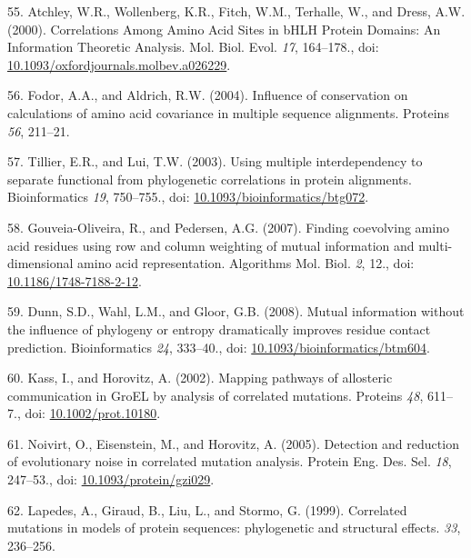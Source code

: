 \documentclass[11pt,a4paper,twoside]{book}
\theoremstyle{definition}
\theoremstyle{definition}
\theoremstyle{remark}
\begin{document}
\hypertarget{ref-Atchley2000}{}
55. Atchley, W.R., Wollenberg, K.R., Fitch, W.M., Terhalle, W., and
Dress, A.W. (2000). Correlations Among Amino Acid Sites in bHLH Protein
Domains: An Information Theoretic Analysis. Mol. Biol. Evol. \emph{17},
164--178., doi:
\href{https://doi.org/10.1093/oxfordjournals.molbev.a026229}{10.1093/oxfordjournals.molbev.a026229}.

\hypertarget{ref-Fodor2004}{}
56. Fodor, A.A., and Aldrich, R.W. (2004). Influence of conservation on
calculations of amino acid covariance in multiple sequence alignments.
Proteins \emph{56}, 211--21.

\hypertarget{ref-Tillier2003}{}
57. Tillier, E.R., and Lui, T.W. (2003). Using multiple interdependency
to separate functional from phylogenetic correlations in protein
alignments. Bioinformatics \emph{19}, 750--755., doi:
\href{https://doi.org/10.1093/bioinformatics/btg072}{10.1093/bioinformatics/btg072}.

\hypertarget{ref-Gouveia_Oliveira2007}{}
58. Gouveia-Oliveira, R., and Pedersen, A.G. (2007). Finding coevolving
amino acid residues using row and column weighting of mutual information
and multi-dimensional amino acid representation. Algorithms Mol. Biol.
\emph{2}, 12., doi:
\href{https://doi.org/10.1186/1748-7188-2-12}{10.1186/1748-7188-2-12}.

\hypertarget{ref-Dunn2008}{}
59. Dunn, S.D., Wahl, L.M., and Gloor, G.B. (2008). Mutual information
without the influence of phylogeny or entropy dramatically improves
residue contact prediction. Bioinformatics \emph{24}, 333--40., doi:
\href{https://doi.org/10.1093/bioinformatics/btm604}{10.1093/bioinformatics/btm604}.

\hypertarget{ref-Kass2002}{}
60. Kass, I., and Horovitz, A. (2002). Mapping pathways of allosteric
communication in GroEL by analysis of correlated mutations. Proteins
\emph{48}, 611--7., doi:
\href{https://doi.org/10.1002/prot.10180}{10.1002/prot.10180}.

\hypertarget{ref-Noivirt2005}{}
61. Noivirt, O., Eisenstein, M., and Horovitz, A. (2005). Detection and
reduction of evolutionary noise in correlated mutation analysis. Protein
Eng. Des. Sel. \emph{18}, 247--53., doi:
\href{https://doi.org/10.1093/protein/gzi029}{10.1093/protein/gzi029}.

\hypertarget{ref-Lapedes1999}{}
62. Lapedes, A., Giraud, B., Liu, L., and Stormo, G. (1999). Correlated
mutations in models of protein sequences: phylogenetic and structural
effects. \emph{33}, 236--256.
\end{document}
